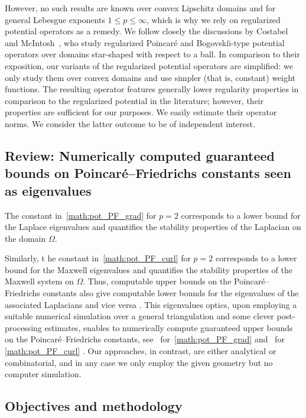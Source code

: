 \documentclass[10pt,a4paper]{article}
\newcommand\cye[1]{%
\protect\leavevmode
\begingroup
    \color{blue}%
    #1%
\endgroup
}
\begin{document}
However, no such results are known over convex Lipschitz domains and for general Lebesgue exponents $1 \leq p \leq \infty$, which is why we rely on regularized potential operators as a remedy. 
We follow closely the discussions by Costabel and McIntosh~\cite{costabel2010bogovskiui},
who study regularized Poincar\'e and Bogovski\u{\i}-type potential operators over domains star-shaped with respect to a ball. 
In comparison to their exposition, our variants of the regularized potential operators are simplified:
we only study them over convex domains and use simpler (that is, constant) weight functions. 
The resulting operator features generally lower regularity properties in comparison to the regularized potential in the literature;
however, their properties are sufficient for our purposes. We easily estimate their operator norms. 
We consider the latter outcome to be of independent interest. 



\subsection{Review: Numerically computed guaranteed bounds on Poincar\'e--Friedrichs constants seen as eigenvalues}

\cye{The constant in~\eqref{math:pot_PF_grad} for $p=2$ corresponds to a lower bound for the Laplace eigenvalues and quantifies the stability properties of the Laplacian on the domain $\Omega$.} 
\cye{Similarly, t}he constant \cye{in~\eqref{math:pot_PF_curl} for $p=2$} corresponds to a lower bound for the Maxwell eigenvalues and quantifies the stability properties of the Maxwell system on $\Omega$. 
Thus, computable upper bounds on the Poincar\'e--Friedrichs constants also give computable lower bounds for the eigenvalues of the associated Laplacians \cye{and vice versa}. 
\cye{This eigenvalues optics, upon employing a suitable numerical simulation} over a general triangulation \cye{and some clever post-processing estimates, enables to numerically compute guaranteed upper bounds on the Poincar\'e--Friedrichs constants, see~\cite{Cars_Ged_LB_eigs_14,Liu_fram_eigs_15} for~\eqref{math:pot_PF_grad} and~\cite{gallistl2023computational} for \eqref{math:pot_PF_curl}}. \cye{Our approaches, in contrast, are either analytical or combinatorial, and in any case we only employ the given geometry but no computer simulation.}



\subsection{Objectives and methodology}
\end{document}

